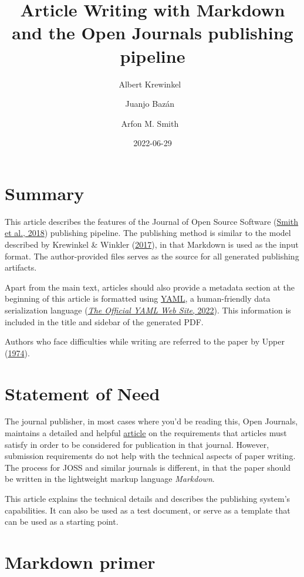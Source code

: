 \documentclass[
]{article}
\title{Article Writing with Markdown and the Open Journals publishing
pipeline}
\author[1,2%
  \ensuremath\mathparagraph]{Albert Krewinkel%
    \,\orcidlink{0000-0002-9455-0796}\,%
    }
\author[1%
  *%
  ]{Juanjo Bazán%
    \,\orcidlink{0000-0001-7699-3983}\,%
    }
\author[1,3%
  *%
  ]{Arfon M. Smith%
    \,\orcidlink{0000-0002-3957-2474}\,%
    }
\affil[1]{Open Journals}
\affil[2]{Pandoc Development Team}
\affil[3]{GitHub}
\affil[$\mathparagraph$]{Corresponding author: %
  albert@zeitkraut.de %
}
\affil[*]{These authors contributed equally.}
\date{2022-06-29}
\begin{document}
\maketitle

\hypertarget{summary}{%
\section{Summary}\label{summary}}

This article describes the features of the Journal of Open Source
Software (\protect\hyperlink{ref-smith2018}{Smith et al., 2018})
publishing pipeline. The publishing method is similar to the model
described by Krewinkel \& Winkler
(\protect\hyperlink{ref-krewinkel2017}{2017}), in that Markdown is used
as the input format. The author-provided files serves as the source for
all generated publishing artifacts.

Apart from the main text, articles should also provide a metadata
section at the beginning of this article is formatted using
\href{https://yaml.org}{YAML}, a human-friendly data serialization
language (\protect\hyperlink{ref-yaml_website}{\emph{The {Official YAML
Web Site}}, 2022}). This information is included in the title and
sidebar of the generated PDF.

Authors who face difficulties while writing are referred to the paper by
Upper (\protect\hyperlink{ref-upper1974}{1974}).

\hypertarget{statement-of-need}{%
\section{Statement of Need}\label{statement-of-need}}

The journal publisher, in most cases where you'd be reading this, Open
Journals, maintains a detailed and helpful
\href{https://joss.readthedocs.io/en/latest/submitting.html}{article} on
the requirements that articles must satisfy in order to be considered
for publication in that journal. However, submission requirements do not
help with the technical aspects of paper writing. The process for JOSS
and similar journals is different, in that the paper should be written
in the lightweight markup language \emph{Markdown}.

This article explains the technical details and describes the publishing
system's capabilities. It can also be used as a test document, or serve
as a template that can be used as a starting point.

\hypertarget{markdown-primer}{%
\section{Markdown primer}\label{markdown-primer}}
\end{document}
